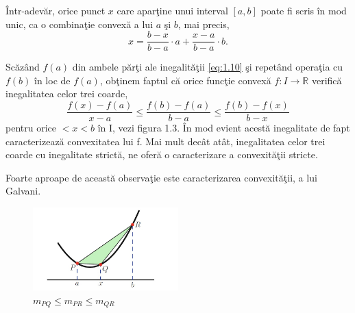 \documentclass[a4paper,12pt,oneside]{report}
\begin{document}
\^{I}ntr-adev\u{a}r,  orice punct \(x\) care apar\c{t}ine unui interval \(\left [ a,b \right ]\) poate fi scris \^{i}n mod unic, ca o combina\c{t}ie convex\u{a} a lui \(a\) \c{s}i \(b\), mai precis,
\begin{displaymath}
    x = \frac{b - x}{b - a} \cdot a  + \frac{x- a}{b - a}\cdot b.
\end{displaymath}

Sc\u{a}z\^{a}nd \(f\left ( a \right )\) din ambele p\u{a}r\c{t}i ale inegalit\u{a}\c{t}ii \ref{eq:1.10} \c{s}i repet\^{a}nd opera\c{t}ia cu \(f\left ( b \right )\) \^{i}n loc de \(f\left ( a \right )\), ob\c{t}inem faptul c\u{a} orice func\c{t}ie convex\u{a} \(f : I \rightarrow \mathbb{R}\) verific\u{a} inegalitatea celor trei coarde,
\begin{displaymath}
   \frac{f\left ( x \right ) - f\left ( a \right )}{x-a}\leq \frac{f\left ( b \right )- f\left ( a \right )}{b-a}\leq \frac{f\left ( b \right ) - f\left ( x \right )}{b-x} \label{eq:1.12} \tag{1.12}
\end{displaymath}
pentru orice \(< x< b\) \^{i}n I, vezi figura 1.3. \^{I}n mod evient acest\u{a} inegalitate de fapt caracterizeaz\u{a} convexitatea lui f. Mai mult dec\^{a}t at\^{a}t, inegalitatea celor trei coarde cu inegalitate strict\u{a}, ne ofer\u{a} o caracterizare a convexit\u{a}\c{t}ii stricte.

Foarte aproape de aceast\u{a} observa\c{t}ie este caracterizarea convexit\u{a}\c{t}ii, a lui Galvani.

\begin{figure}[htbp]
	\centering
	\includegraphics[width=0.5\textwidth]{fig1.3.png}
	\caption{ \(m_{PQ} \leq m_{PR}\leq  m_{QR}\) }
\end{figure}
\end{document}
